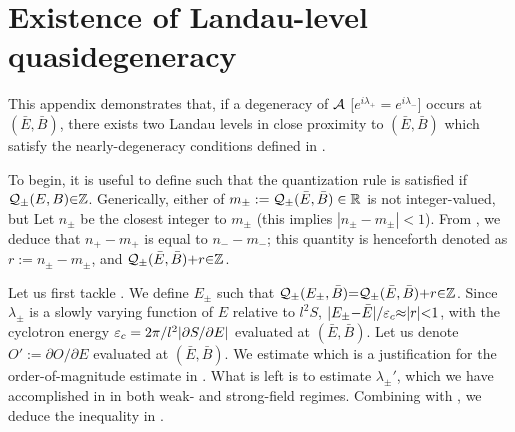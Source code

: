 \documentclass[aps, prb, showpacs, twocolumn, notitlepage, superscriptaddress]{revtex4-1}
\begin{document}
\section{Existence of Landau-level quasidegeneracy}\label{sec:proofLLquasideg}

This appendix demonstrates that, if a degeneracy of ${\cal A}$ [$e^{i\lambda_+}{=}e^{i\lambda_-}$] occurs at $(\bar{E},\bar{B})$, there exists two Landau levels in close proximity to $(\bar{E},\bar{B})$ which satisfy the nearly-degeneracy conditions defined in .

To begin, it is useful to define
such that the quantization rule  is satisfied if ${\cal Q}_{\pm}(E,B){\in}\mathbb{Z}$. 
Generically, either of $m_{\pm}:={\cal Q}_{\pm}(\bar{E},\bar{B})\in \mathbb{R}$ is not integer-valued, but 
Let $n_{\pm}$ be the closest integer to $m_{\pm}$ (this implies $|n_{\pm}-m_{\pm}|<1$).  From , we deduce that $n_+-m_+$ is equal to $n_--m_-$; this quantity is henceforth denoted as $r:= n_{\pm}-m_{\pm}$, and  ${\cal Q}_{\pm}(\bar{E},\bar{B}){+}r{\in} \mathbb{Z}$. 

Let us first tackle . We define $E_{\pm}$ such that ${\cal Q}_{\pm}(E_{\pm},\bar{B}){=}{\cal Q}_{\pm}(\bar{E},\bar{B}){+}r{\in} \mathbb{Z}$. Since  $\lambda_{\pm}$ is a slowly varying function of $E$ relative to $l^2S$, $|E_{\pm}{-}\bar{E}|/\varepsilon_c{\approx} |r|{<}1$, with the cyclotron energy $\varepsilon_c=2\pi/l^2|\partial S/\partial E|$ evaluated at $(\bar{E},\bar{B})$. Let us denote $O':=\partial O/\partial E$ evaluated at $(\bar{E},\bar{B})$. We estimate
which is a justification for the order-of-magnitude estimate in .
What is left is to estimate $\lambda_{\pm}'$, which we have accomplished in  in both weak- and strong-field regimes. Combining   with , we deduce the inequality in .  
\end{document}
